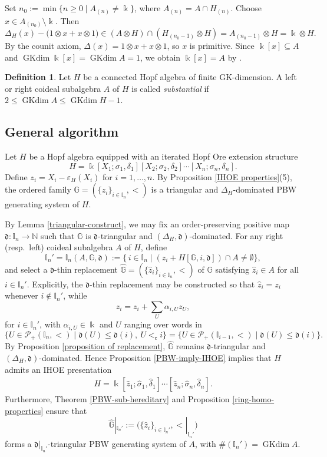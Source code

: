 \documentclass{article}
\makeatletter
\renewenvironment{proof}[1][\proofname]{\par
	\pushQED{\qed}%
	\normalfont \topsep6\p@\@plus6\p@\relax
	\trivlist
	\item[\hskip\labelsep
	\bfseries
	#1\@addpunct{.}]\ignorespaces
}{%
	\popQED\endtrivlist\@endpefalse
}
\theoremstyle{plain}
\theoremstyle{definition}
\newtheorem{definition}[thm]{Definition}
\numberwithin{equation}{section}
\DeclareMathOperator{\GKdim}{GKdim}
\newcommand{\PP}{\mathcal{P}}
\newcommand{\GG}{\mathbb{G}}
\newcommand{\II}{\mathbb{I}}
\newcommand{\dd}{\mathfrak{d}}
\newcommand{\rr}{\mathfrak{r}}
\makeatother
\begin{document}
	\begin{proof}
		Set $n_{0}:=\min \{n\geq 0 \mid A_{(n)}\neq \Bbbk\}$, where $A_{(n)} =A\cap H_{(n)}$. Choose $x\in A_{(n_{0})}\setminus \Bbbk$. Then
		\[
		\Delta_{H}(x) -\bigl(1\otimes x+ x\otimes 1\bigr) \in (A\otimes H) \cap (H_{(n_{0}-1)} \otimes H) = A_{(n_{0}-1)} \otimes H =\Bbbk \otimes H.
		\]
		By the counit axiom, $\Delta(x) =1\otimes x+x\otimes 1$, so $x$ is primitive. Since $\Bbbk[x] \subseteq A$ and $\GKdim \Bbbk[x] =\GKdim A =1$, we obtain $\Bbbk[x] = A$ by \cite[Theorem A]{LZ23}.
	\end{proof}
	
	\begin{definition}
		Let $H$ be a connected Hopf algebra of finite GK-dimension. A left or right coideal subalgebra $A$ of $H$ is called \emph{substantial} if $2\leq \GKdim A \leq \GKdim H-1$.
	\end{definition}
	
	\subsection{General algorithm}
	\label{subsec:algorithm}
	
	Let $H$ be a Hopf algebra equipped with an iterated Hopf Ore extension structure
	\[
	H = \Bbbk[X_{1};\sigma_{1},\delta_{1}][X_{2};\sigma_{2},\delta_{2}]\cdots
	[X_{n};\sigma_{n},\delta_{n}].
	\]
	Define $z_{i} = X_{i} -\varepsilon_{H}(X_{i})$ for $i=1,\ldots, n$. By Proposition \ref{IHOE properties}(5), the ordered family $\GG=(\{z_{i}\}_{i\in \II_{n}}, <)$ is a triangular and $\Delta_{H}$-dominated PBW generating system of $H$.
	
	By Lemma \ref{triangular-construct}, we may fix an order-preserving positive map $\dd\colon\II_{n} \to\mathbb{N}$ such that $\GG$ is $\dd$-triangular and $(\Delta_{H},\dd)$-dominated. For any right (resp.\ left) coideal subalgebra $A$ of $H$, define
	\[
	\II_{n}'=\II_{n}(A,\GG,\dd):=\{\, i\in\II_{n}\mid (z_{i}+H[\GG,i,\dd]) \cap A \neq \emptyset\},
	\]
	and select a $\dd$-thin replacement $\hat{\GG}=(\{\hat{z}_{i}\}_{i\in \II_{n}}, <)$ of $\GG$ satisfying $\hat{z}_{i} \in A$ for all $i\in \II_{n}'$. Explicitly, the $\dd$-thin replacement may be constructed so that $\hat z_{i} =z_{i}$ whenever $i\not\in \II_{n}'$, while
	\[
	\hat z_{i}=z_{i}+\sum_{U}\alpha_{i,U}z_{U},
	\]
	for $i\in\II_{n}'$, with $\alpha_{i,U}\in\Bbbk$ and $U$ ranging over words in
	\[
	\{U \in \PP_{+}(\II_{n},<) \mid \dd(U)\le \dd(i), ~ U<_{\rr}i\} = \{U \in \PP_{+}(\II_{i-1},<) \mid \dd(U)\le \dd(i)\}.
	\]
	By Proposition \ref{proposition of replacement}, $\hat{\GG}$ remains $\dd$-triangular and $(\Delta_{H}, \dd)$-dominated. Hence Proposition \ref{PBW-imply-IHOE} implies that $H$ admits an IHOE presentation
	\begin{eqnarray}\label{IHOE-thin-replacement}
		H=\Bbbk[\hat{z}_{1};\hat{\sigma}_{1},\hat{\delta}_{1}]\cdots [\hat{z}_{n};\hat{\sigma}_{n},\hat{\delta}_{n}].
	\end{eqnarray}
	Furthermore, Theorem \ref{PBW-sub-hereditary} and Proposition \ref{ring-homo-properties} ensure that
	\[
	\hat{\GG}|_{\II_{n}'}:= \bigl(\{\hat{z}_{i}\}_{i\in \II_{n}'}, {<}|_{\II_{n}'}\bigr)
	\]
	forms a $\dd|_{\II_{n}'}$-triangular PBW generating system of $A$, with $\#(\II_{n}') =\GKdim A$.
	
\end{document}
